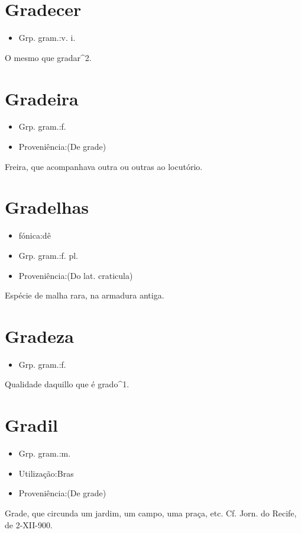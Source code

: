 \section{Gradecer}
\begin{itemize}
\item {Grp. gram.:v. i.}
\end{itemize}
O mesmo que \textunderscore gradar\textunderscore ^2.
\section{Gradeira}
\begin{itemize}
\item {Grp. gram.:f.}
\end{itemize}
\begin{itemize}
\item {Proveniência:(De \textunderscore grade\textunderscore )}
\end{itemize}
Freira, que acompanhava outra ou outras ao locutório.
\section{Gradelhas}
\begin{itemize}
\item {fónica:dê}
\end{itemize}
\begin{itemize}
\item {Grp. gram.:f. pl.}
\end{itemize}
\begin{itemize}
\item {Proveniência:(Do lat. \textunderscore craticula\textunderscore )}
\end{itemize}
Espécie de malha rara, na armadura antiga.
\section{Gradeza}
\begin{itemize}
\item {Grp. gram.:f.}
\end{itemize}
Qualidade daquillo que é \textunderscore grado\textunderscore ^1.
\section{Gradil}
\begin{itemize}
\item {Grp. gram.:m.}
\end{itemize}
\begin{itemize}
\item {Utilização:Bras}
\end{itemize}
\begin{itemize}
\item {Proveniência:(De \textunderscore grade\textunderscore )}
\end{itemize}
Grade, que circunda um jardim, um campo, uma praça, etc. Cf. \textunderscore Jorn. do Recife\textunderscore , de 2-XII-900.
